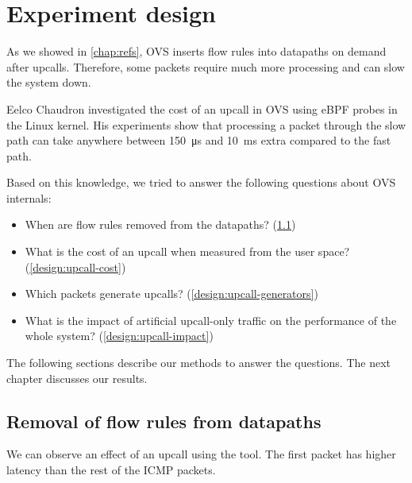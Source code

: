 \chapter{Experiment design}
\label{chap:design}

As we showed in \cref{chap:refs}, OVS inserts flow rules into datapaths on demand after upcalls. Therefore, some packets require much more processing and can slow the system down. 

Eelco Chaudron investigated the cost of an upcall in OVS \cite{UpcallCost} using eBPF probes in the Linux kernel. His experiments show that processing a packet through the slow path can take anywhere between \qty{150}{\us} and \qty{10}{\ms} extra compared to the fast path.

Based on this knowledge, we tried to answer the following questions about OVS internals:

\begin{itemize}
    \item When are flow rules removed from the datapaths? (\cref{design:flow-eviction})
    \item What is the cost of an upcall when measured from the user space? (\cref{design:upcall-cost})
    \item Which packets generate upcalls? (\cref{design:upcall-generators})
    \item What is the impact of artificial upcall-only traffic on the performance of the whole system? (\cref{design:upcall-impact})
\end{itemize}

The following sections describe our methods to answer the questions. The next chapter discusses our results.




\section{Removal of flow rules from datapaths}
\label{design:flow-eviction}

We can observe an effect of an upcall using the  tool. The first packet has higher latency than the rest of the ICMP packets.

\vspace{0.5cm}

